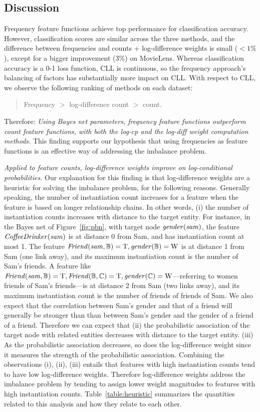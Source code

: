 \documentclass[twoside,11pt]{article}
\newcommand{\keypoint}[1]{{\em #1}}
\begin{document}
\subsection{Discussion} Frequency feature functions achieve top performance for  classification accuracy. However, classification scores are similar across the three methods, and the difference between frequencies and counts + log-difference weights is small ($<1\%$), except for a bigger improvement (3\%) on MovieLens. Whereas classification accuracy is a 0-1 loss function, CLL is continuous, so the frequency approach's balancing of factors has substantially more impact on CLL. With respect to CLL, we observe the following ranking of methods on each dataset: 
\begin{quote}
Frequency $>$ log-difference count $>$ count.
\end{quote} Therefore: \keypoint{Using Bayes net parameters, frequency feature functions outperform count feature functions, with both the log-cp and the log-diff weight computation methods.} This finding supports our hypothesis that using frequencies as feature functions is an effective way of addressing the imbalance problem.

\keypoint{Applied to feature counts, log-difference weights improve on log-conditional probabilities.} Our explanation for this finding is that log-difference weights are a heuristic for solving the imbalance problem, for the following reasons. 
Generally speaking, the number of instantiation count increases for a feature when the feature is based on longer relationship chains. In other words, (i) the number of instantiation counts increases with distance to the target entity.
 For instance, in the Bayes net of Figure~\ref{fig:pbn}, with target node $\it{gender}(sam)$, the feature $\it{CoffeeDrinker}(sam)$ is at distance 0 from Sam, and has instantiation count at most 1. The feature $\it{Friend}(sam,\mathbb{B}) = \mathrm{T},\it{gender}(\mathbb{B}) = \mathrm{W}$ is at distance 1 from Sam (one link away), and its maximum instantiation count is the number of Sam's friends. A feature like $\it{Friend}(sam,\mathbb{B}) = \mathrm{T}, \it{Friend}(\mathbb{B},\mathbb{C}) = \mathrm{T}, \it{gender}(\mathbb{C}) = \mathrm{W}$---referring to women friends of Sam's friends---is at distance 2 from Sam (two links away), and its maximum instantiation count is the number of friends of friends of Sam. We also expect that the correlation between Sam's gender and that of a friend will generally be stronger than than between Sam's gender and the gender of a friend of a friend. Therefore we can expect that (ii) the probabilistic association of the target node with related entities decreases with distance to the target entity. (iii) As the probabilistic association decreases, so does the log-difference weight since it measures the strength of the probabilistic association. Combining the observations (i), (ii), (iii) entails that features with high instantiation counts tend to have low log-difference weights. Therefore log-difference weights address the imbalance problem by tending to assign lower weight magnitudes to features with high instantiation counts. Table~\ref{table:heuristic} summarizes the quantities related to this analysis and how they relate to each other. 
\end{document}
